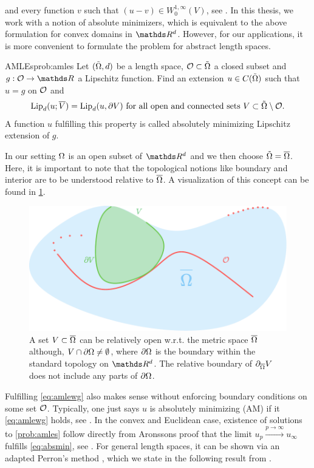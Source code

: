 %
and every function $v$ such that $(u-v)\in W^{1,\infty}_0(V)$, see \cite{aronsson1967extension}. In this thesis, we work with a notion of absolute minimizers, which is equivalent to the above formulation for convex domains in $\R^d$. However, for our applications, it is more convenient to formulate the problem for abstract length spaces.
%
\begin{problem}{AMLEs}{prob:amles}
Let $(\tilde{\Omega}, d)$ be a length space, $\mathcal{O}\subset\tilde{\Omega}$ a closed subset and $g:\conset\to\R$ a Lipschitz function. Find an extension $u\in C(\tilde{\Omega})$ such that $u=g$ on $\mathcal{O}$ and
%
\begin{align}\label{eq:amlewg}
\operatorname{Lip}_d(u; \overline{V}) = \operatorname{Lip}_d(u, \partial V) \text{ for all open and connected sets } V\subset \tilde{\Omega}\setminus \mathcal{O}.
\end{align}
%
A function $u$ fulfilling this property is called absolutely minimizing Lipschitz extension of $g$.
\end{problem}
%
\begin{remark}{}{}
In our setting $\Omega$ is an open subset of $\R^d$ and we then choose $\tilde{\Omega} = \overline{\Omega}$. Here, it is important to note that 
the topological notions like boundary and interior are to be understood relative to $\overline{\Omega}$. A visualization of this concept can be found in \cref{fig:relb}.
\end{remark}
%
\begin{figure}
\begin{center}
\includegraphics[width=.5\textwidth]{atelier/SSL/relboundary.pdf}
\end{center}
\caption[Visualization of the relative boundary.]{A set $V\subset\overline{\Omega}$ can be relatively open w.r.t. the metric space $\overline{\Omega}$ although, $V\cap\partial\Omega \neq\emptyset$, where $\partial \Omega$ is the boundary within the standard topology on $\R^d$. The relative boundary of $\partial_{\overline{\Omega}} V$ does not include any parts of $\partial \Omega$.}\label{fig:relb}
\end{figure}
%
%
\noindent%
Fulfilling \cref{eq:amlewg} also makes sense without enforcing boundary conditions on some set $\mathcal{O}$. Typically, one just says $u$ is absolutely minimizing (AM) if it \cref{eq:amlewg} holds, see \cite{aronsson2004tour}. In the convex and Euclidean case, existence of solutions to \cref{prob:amles} follow directly from Aronssons proof that the limit $u_p\xrightarrow{p\to\infty} u_\infty$ fulfills \cref{eq:absmin}, see \cite{aronsson1967extension}. For general length spaces, it can be shown via an adapted Perron's method \cite{perron1923neue}, which we state in the following result from \cite{juutinen2002absolutely}.

